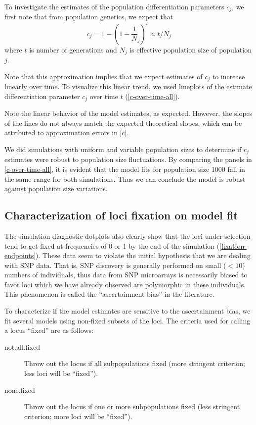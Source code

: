 \documentclass[a4paper,12pt]{article}
\begin{document}
To investigate the estimates of the population differentiation
parameters $c_j$, we first note that from population genetics, we
expect that
\begin{equation}
  \label{c}
 c_j = 1 - (1 - \frac 1 N_j)^t\approx t/N_j  
\end{equation}
where $t$ is number of generations and $N_j$ is effective population
size of population $j$.

Note that this approximation implies that we expect estimates of $c_j$
to increase linearly over time. To visualize this linear trend, we
used lineplots of the estimate differentiation parameter $c_j$ over
time $t$ (\autoref{c-over-time-all}).


Note the linear behavior of the model estimates, as expected. However,
the slopes of the lines do not always match the expected theoretical
slopes, which can be attributed to approximation errors in
\autoref{c}.

We did simulations with uniform and variable population sizes to
determine if $c_j$ estimates were robust to population size
fluctuations. By comparing the panels in \autoref{c-over-time-all}, it
is evident that the model fits for population size 1000 fall in the
same range for both simulations. Thus we can conclude the model is
robust against population size variations.

\subsection{Characterization of loci fixation on model fit}

The simulation diagnostic dotplots also clearly show that the loci
under selection tend to get fixed at frequencies of 0 or 1 by the end
of the simulation (\autoref{fixation-endpoints}). These data seem to
violate the initial hypothesis that we are dealing with SNP data. That
is, SNP discovery is generally performed on small ($<10$) numbers of
individuals, thus data from SNP microarrays is necessarily biased to
favor loci which we have already observed are polymorphic in these
individuals. This phenomenon is called the ``ascertainment bias'' in
the literature.

To characterize if the model estimates are sensitive to the
ascertainment bias, we fit several models using non-fixed subsets of
the loci. The criteria used for calling a locus ``fixed'' are as
follows:
\begin{description}
\item[not.all.fixed] Throw out the locus if all subpopulations fixed
  (more stringent criterion; less loci will be ``fixed'').
\item[none.fixed] Throw out the locus if one or more subpopulations
  fixed (less stringent criterion; more loci will be ``fixed'').
\end{description}
\end{document}
